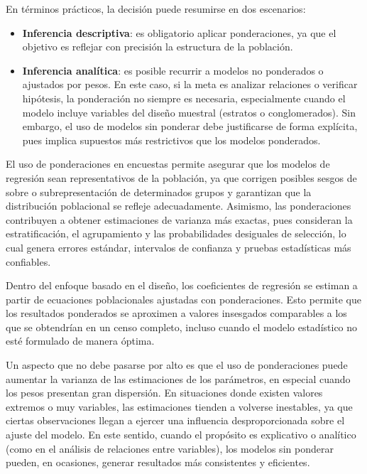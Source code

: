 \documentclass[
  12pt,
]{book}
\begin{document}
En términos prácticos, la decisión puede resumirse en dos escenarios:

\begin{itemize}
\item
  \textbf{Inferencia descriptiva}: es obligatorio aplicar ponderaciones, ya que el objetivo es reflejar con precisión la estructura de la población.
\item
  \textbf{Inferencia analítica}: es posible recurrir a modelos no ponderados o ajustados por pesos. En este caso, si la meta es analizar relaciones o verificar hipótesis, la ponderación no siempre es necesaria, especialmente cuando el modelo incluye variables del diseño muestral (estratos o conglomerados). Sin embargo, el uso de modelos sin ponderar debe justificarse de forma explícita, pues implica supuestos más restrictivos que los modelos ponderados.
\end{itemize}

El uso de ponderaciones en encuestas permite asegurar que los modelos de regresión sean representativos de la población, ya que corrigen posibles sesgos de sobre o subrepresentación de determinados grupos y garantizan que la distribución poblacional se refleje adecuadamente. Asimismo, las ponderaciones contribuyen a obtener estimaciones de varianza más exactas, pues consideran la estratificación, el agrupamiento y las probabilidades desiguales de selección, lo cual genera errores estándar, intervalos de confianza y pruebas estadísticas más confiables.

Dentro del enfoque basado en el diseño, los coeficientes de regresión se estiman a partir de ecuaciones poblacionales ajustadas con ponderaciones. Esto permite que los resultados ponderados se aproximen a valores insesgados comparables a los que se obtendrían en un censo completo, incluso cuando el modelo estadístico no esté formulado de manera óptima.

Un aspecto que no debe pasarse por alto es que el uso de ponderaciones puede aumentar la varianza de las estimaciones de los parámetros, en especial cuando los pesos presentan gran dispersión. En situaciones donde existen valores extremos o muy variables, las estimaciones tienden a volverse inestables, ya que ciertas observaciones llegan a ejercer una influencia desproporcionada sobre el ajuste del modelo. En este sentido, cuando el propósito es explicativo o analítico (como en el análisis de relaciones entre variables), los modelos sin ponderar pueden, en ocasiones, generar resultados más consistentes y eficientes.
\end{document}
